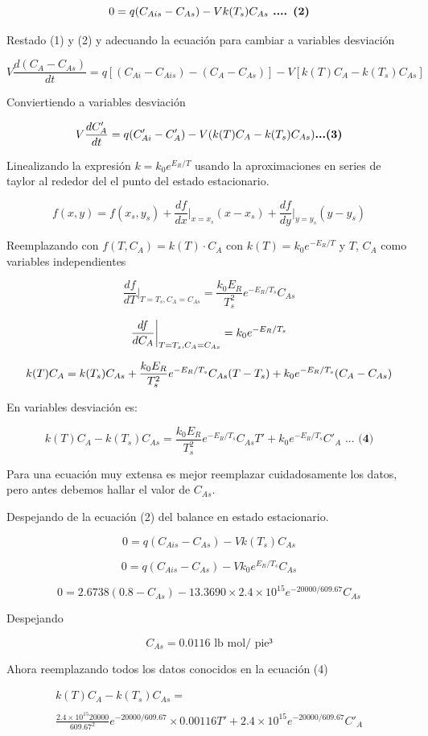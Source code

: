\documentclass[
  letterpaper,
  DIV=11,
  numbers=noendperiod]{scrreprt}
\begin{document}
\[
0=q(C_{Ais}-C_{As})-Vk(T_s)C_{As}\space\space\space\space\textbf{ .... (2)}
\]

Restado (1) y (2) y adecuando la ecuación para cambiar a variables
desviación

\[
V\frac{d(C_A-C_{As})}{dt}=q\left[(C_{Ai}-C_{Ais})-(C_A-C_{As})\right]-V\left[k(T)C_A-k(T_s)C_{As}\right]
\]

Conviertiendo a variables desviación

\[
V\frac{dC'_A}{dt}=q(C'_{Ai}-C'_A)-V(k(T)C_A-k(T_s)C_{As}) \space\space\space\space\textbf{...(3)}
\]

Linealizando la expresión \(k = k_0e^{E_R/T}\) usando la aproximaciones
en series de taylor al rededor del el punto del estado estacionario.

\[
f(x,y)=f(x_s,y_s)+\frac{df}{dx}\bigg|_{x=x_s}(x-x_s)+\frac{df}{dy}\bigg|_{y=y_s}(y-y_s)
\]

Reemplazando con \(f(T,C_A)=k(T)\cdot C_A\) con \(k(T) = k_0e^{-E_R/T}\)
y \(T\), \(C_A\) como variables independientes

\[
\frac{df}{dT}\bigg|_{T=T_s, C_A=C_{As}}= \frac{k_0E_R}{T_s^2}e^{-E_R/T_s}C_{As}
\]

\[
\frac{df}{dC_{A}}\bigg|_{T=T_s, C_A=C_{As}}= k_0e^{-E_R/T_s}
\\
\]

\[
\\
k(T)C_A = k(T_s)C_{As}+\frac{k_0E_R}{T_s^2}e^{-E_R/T_s}C_{As}(T-T_s)+ k_0e^{-E_R/T_s}(C_A-C_{As})
\]

En variables desviación es:

\[
k(T)C_A - k(T_s)C_{As}=\frac{k_0E_R}{T_s^2}e^{-E_R/T_s}C_{As}T'+ k_0e^{-E_R/T_s}C'_A\textbf{ ... (4)}
\]

Para una ecuación muy extensa es mejor reemplazar cuidadosamente los
datos, pero antes debemos hallar el valor de \(C_{As}\).

Despejando de la ecuación (2) del balance en estado estacionario.

\[
0=q(C_{Ais}-C_{As})-Vk(T_s)C_{As}
\]

\[
0=q(C_{Ais}-C_{As})-Vk_0e^{E_R/T_s}C_{As}
\]

\[
0=2.6738(0.8-C_{As})-13.3690\times 2.4\times 10^{15} e^{-20000/609.67}C_{As}
\]

Despejando

\[
C_{As}=0.0116\text{ lb mol/ pie³}
\]

Ahora reemplazando todos los datos conocidos en la ecuación (4)

\[
\begin{array}{l}
k(T)C_A - k(T_s)C_{As} = \\ \\ \frac{2.4\times 10^{15} 20000}{609.67^2}e^{-20000/609.67}\times 0.00116T'+ 2.4\times 10 ^{15}e^{-20000/609.67}C'_A
\end{array}
\]
\end{document}
